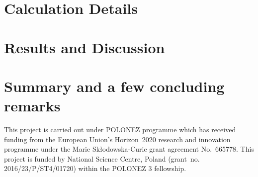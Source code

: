 \section{\label{s:3}Calculation Details}
\section{\label{s:4}Results and Discussion}
\section{\label{s:5}Summary and a few concluding remarks}


\begin{acknowledgments}
This project is carried out under POLONEZ programme which has received funding from the European Union's
Horizon~2020 research and innovation programme under the Marie Skłodowska-Curie grant agreement 
No.~665778. This project is funded by National Science Centre, Poland 
(grant~no. 2016/23/P/ST4/01720) within the POLONEZ 3 fellowship.
\end{acknowledgments}





